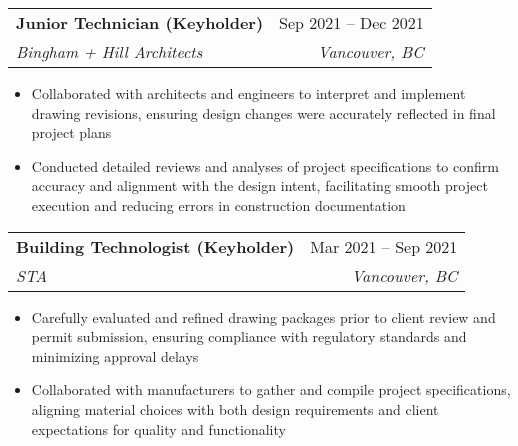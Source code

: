 \documentclass[letterpaper,11pt]{article}
\makeatletter
\newcommand{\resumeItem}[1]{
  \item\small{
    {#1 \vspace{-2pt}}
  }
}
\newcommand{\resumeSubheading}[4]{
  \vspace{-2pt}\item
    \begin{tabular*}{0.97\textwidth}[t]{l@{\extracolsep{\fill}}r}
      \textbf{#1} & #2 \\
      \textit{\small#3} & \textit{\small #4} \\
    \end{tabular*}\vspace{-7pt}
}
\newcommand{\resumeSubSubheading}[2]{
    \item
    \begin{tabular*}{0.97\textwidth}{l@{\extracolsep{\fill}}r}
      \textit{\small#1} & \textit{\small #2} \\
    \end{tabular*}\vspace{-7pt}
}
\newcommand{\resumeSubHeadingListEnd}{\end{itemize}}
\newcommand{\resumeItemListStart}{\begin{itemize}}
\newcommand{\resumeItemListEnd}{\end{itemize}\vspace{-5pt}}
\makeatother
\begin{document}
\resumeSubheading
{Junior Technician (Keyholder)}{Sep 2021 -- Dec 2021}
{Bingham + Hill Architects}{Vancouver, BC}
\resumeItemListStart
\resumeItem{Collaborated with architects and engineers to interpret and implement drawing revisions, ensuring design changes were accurately reflected in final project plans}
\resumeItem{Conducted detailed reviews and analyses of project specifications to confirm accuracy and alignment with the design intent, facilitating smooth project execution and reducing errors in construction documentation}
\resumeItemListEnd

\resumeSubheading
{Building Technologist (Keyholder)}{Mar 2021 -- Sep 2021}
{STA}{Vancouver, BC}
\resumeItemListStart
\resumeItem{Carefully evaluated and refined drawing packages prior to client review and permit submission, ensuring compliance with regulatory standards and minimizing approval delays}
\resumeItem{Collaborated with manufacturers to gather and compile project specifications, aligning material choices with both design requirements and client expectations for quality and functionality}
\resumeItemListEnd




\end{document}
